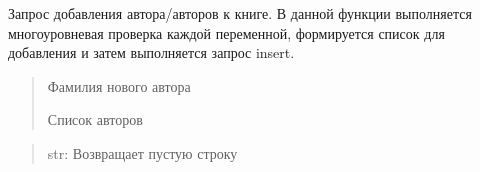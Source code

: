 \documentclass[letterpaper,10pt,russian]{sphinxmanual}
\begin{document}
\begin{fulllineitems}
\label{\detokenize{blueprints:blueprints.add_to_database.change_add_author}}
\pysigstartsignatures
{}
\pysigstopsignatures
\sphinxAtStartPar
Запрос добавления автора/авторов к книге.
В данной функции выполняется многоуровневая проверка каждой переменной,
формируется список для добавления и затем выполняется запрос insert.
\begin{description}
\begin{quote}\begin{description}
\sphinxAtStartPar
Фамилия нового автора

\sphinxAtStartPar
Список авторов

\end{description}\end{quote}

\end{description}
\begin{quote}\begin{description}
\sphinxAtStartPar
str: Возвращает пустую строку

\end{description}\end{quote}

\end{fulllineitems}

\end{document}
